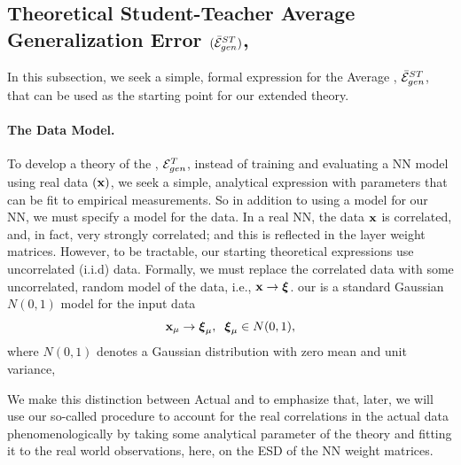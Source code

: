 \subsection{Theoretical Student-Teacher Average Generalization Error $(\bar{\mathcal{E}}^{ST}_{gen})$, }
\label{sxn:SMOG_main-st_av}

In this subsection, we seek a simple, formal expression for the
\StudentTeacher Average \GeneralizationError, $\bar{\mathcal{E}}^{ST}_{gen}$,
that can be used as the starting point for our extended \SemiEmpirical theory.

%

\paragraph{The Data Model.}

To develop a \SemiEmpirical theory of the \Teacher \GeneralizationError, ${\mathcal{E}}_{gen}^{T}$, 
instead of training and evaluating a NN model using real data $(\mathbf{x})$,
we seek a simple, analytical expression with parameters that can be fit to empirical measurements.
So in addition to using a model for our NN, we must specify a model for the data.
In a real NN, the data $\mathbf{x}$ is correlated, and, in fact, very strongly correlated;
and this is reflected in the layer weight matrices.
However, to be tractable, our starting theoretical expressions use uncorrelated (i.i.d) data.
Formally, we must replace the correlated data 
with some uncorrelated, random model of the data, i.e., ${\mathbf{x}}\rightarrow\boldsymbol{\xi}$.
our \DataModel is a standard Gaussian $N(0,1)$ model for the input data
\begin{align}
\mathbf{x}_{\mu}\rightarrow\boldsymbol{\xi}_{\mu},\;\;\boldsymbol{\xi}_{\mu}\in N(0,1) ,
\label{eqn:mwm_replace_1}
\end{align}
where $N(0,1)$ denotes a Gaussian distribution with zero mean and unit variance,

We make this distinction between Actual and \ModelData to emphasize that,
later, we will use our so-called \SemiEmpirical procedure to
account for the real correlations in the actual data phenomenologically
by taking some analytical parameter of the theory and fitting it to the real world observations,
here, on the ESD of the NN weight matrices.


